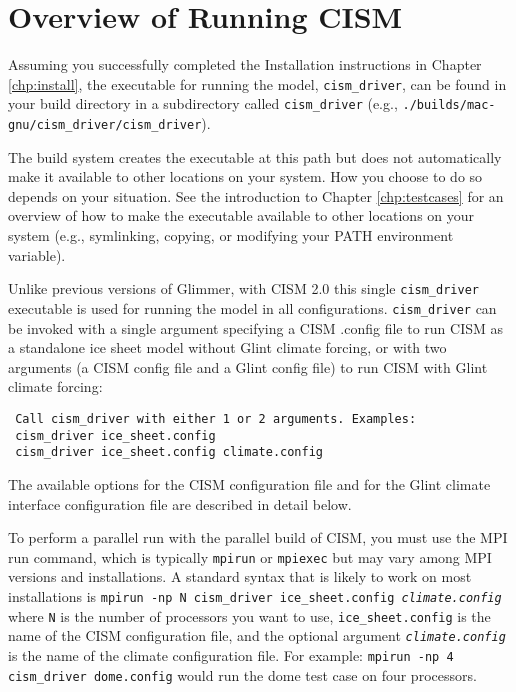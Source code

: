 \label{ch:runcism}

\section{Overview of Running CISM}

Assuming you successfully completed the Installation instructions in Chapter \ref{chp:install},
the executable for running the model, \texttt{cism\_driver}, can be found in your 
build directory in a subdirectory called \texttt{cism\_driver} 
(e.g., \texttt{./builds/mac-gnu/cism\_driver/cism\_driver}).

The build system creates the executable at this path but does not automatically
make it available to other locations on your system.  How you choose to do so depends 
on your situation.  See the introduction to Chapter \ref{chp:testcases} for 
an overview of how to make the executable available to other locations on your system
(e.g., symlinking, copying, or modifying your PATH environment variable).

Unlike previous versions of Glimmer, with CISM 2.0 this single \texttt{cism\_driver} 
executable is used for running the model in all configurations.
\texttt{cism\_driver} can be invoked with a single argument specifying 
a CISM .config file to run CISM as a standalone ice sheet model without Glint climate forcing,
or with two arguments (a CISM config file and a Glint config file) 
to run CISM with Glint climate forcing:
\begin{verbatim}
 Call cism_driver with either 1 or 2 arguments. Examples:
 cism_driver ice_sheet.config
 cism_driver ice_sheet.config climate.config
\end{verbatim}
The available options for the CISM configuration file and 
for the Glint climate interface configuration file are described in detail below.

To perform a parallel run with the parallel build of CISM, you must use the
MPI run command, which is typically \texttt{mpirun} or \texttt{mpiexec} but may 
vary among MPI versions and installations.  A standard syntax that is likely to
work on most installations is \newline
 \indent \texttt{mpirun -np N cism\_driver ice\_sheet.config \textit{climate.config}} \newline
where \texttt{N} is the number of processors you want to use, \texttt{ice\_sheet.config} is the name of the CISM
configuration file, and the optional argument \texttt{\textit{climate.config}} is the name 
of the climate configuration file.  For example: \newline
 \indent \texttt{mpirun -np 4 cism\_driver dome.config}\newline
would run the dome test case on four processors.

